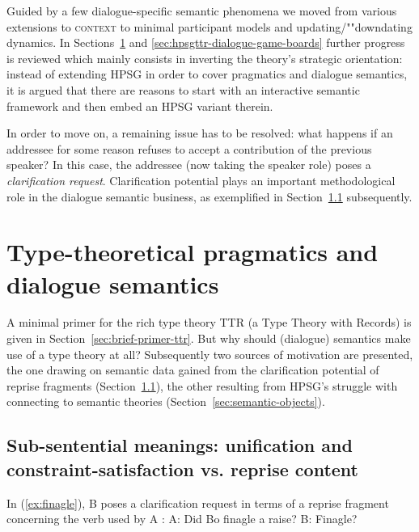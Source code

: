 \documentclass[output=paper]{langsci/langscibook}
\begin{document}
{Guided by a few dialogue-specific semantic phenomena we moved from various extensions to \textsc{context}  to minimal participant models and updating/""downdating dynamics.
%
In Sections~\ref{sec:type-theory-pragmatics-semantics} and \ref{sec:hpsgttr-dialogue-game-boards} further progress is reviewed which mainly consists in inverting the theory's strategic orientation: instead of extending HPSG in order to cover pragmatics and dialogue semantics, it is argued that there are reasons to start with an interactive semantic framework and then embed an HPSG variant therein.


In order to move on, a remaining issue has to be resolved: what happens if an addressee for some reason refuses to accept a contribution of the previous speaker?
%
In this case, the addressee (now taking the speaker role) poses a \emph{clarification request}. 
%
Clarification potential  plays an important methodological role in the dialogue semantic business, as exemplified in Section~\ref{sec:sub-sentential-meanings} subsequently. 




\section{Type-theoretical pragmatics and dialogue semantics}
\label{sec:type-theory-pragmatics-semantics}

A minimal primer for the rich type theory TTR (a Type Theory with Records) is given in Section~\ref{sec:brief-primer-ttr}. 
%
But why should (dialogue) semantics make use of a type theory at all?
%
Subsequently two sources of motivation are presented, the one drawing on semantic data gained from the clarification potential of reprise fragments (Section~\ref{sec:sub-sentential-meanings}), the other resulting from HPSG's struggle with connecting to semantic theories (Section~\ref{sec:semantic-objects}).



  
\subsection{Sub-sentential meanings: unification and constraint-satisfaction vs. reprise content}
\label{sec:sub-sentential-meanings}

In (\ref{ex:finagle}), B poses a clarification request in terms of a reprise fragment concerning the verb used by A \citep[]{Ginzburg:2012}:
%
\ea \label{ex:finagle}
A: Did Bo finagle a raise? B: Finagle?
\z

}
\end{document}
